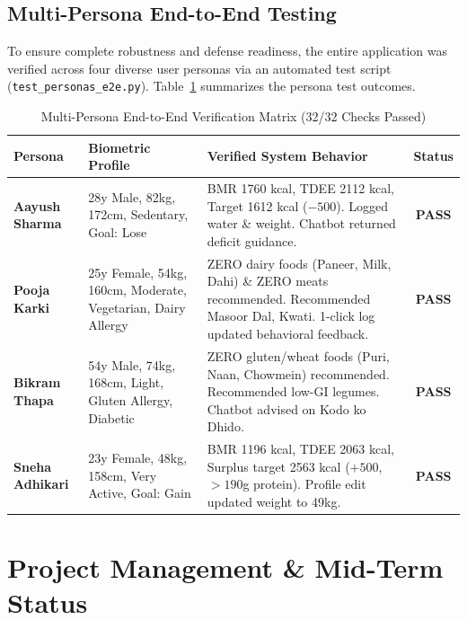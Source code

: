 \documentclass[12pt,a4paper]{report}
\begin{document}
\section{Multi-Persona End-to-End Testing}

To ensure complete robustness and defense readiness, the entire application was verified across four diverse user personas via an automated test script (\texttt{test\_personas\_e2e.py}). Table~\ref{tab:personas} summarizes the persona test outcomes.

\begin{table}[htbp]
\centering
\caption{Multi-Persona End-to-End Verification Matrix (32/32 Checks Passed)}
\label{tab:personas}
\begin{tabular}{p{2.8cm}p{4.2cm}p{5.5cm}c}
\toprule
\textbf{Persona} & \textbf{Biometric Profile} & \textbf{Verified System Behavior} & \textbf{Status} \\
\midrule
\textbf{Aayush Sharma} & 28y Male, 82kg, 172cm, Sedentary, Goal: Lose & BMR 1760 kcal, TDEE 2112 kcal, Target 1612 kcal ($-500$). Logged water \& weight. Chatbot returned deficit guidance. & \textbf{PASS} \\
\midrule
\textbf{Pooja Karki} & 25y Female, 54kg, 160cm, Moderate, Vegetarian, Dairy Allergy & ZERO dairy foods (Paneer, Milk, Dahi) \& ZERO meats recommended. Recommended Masoor Dal, Kwati. 1-click log updated behavioral feedback. & \textbf{PASS} \\
\midrule
\textbf{Bikram Thapa} & 54y Male, 74kg, 168cm, Light, Gluten Allergy, Diabetic & ZERO gluten/wheat foods (Puri, Naan, Chowmein) recommended. Recommended low-GI legumes. Chatbot advised on Kodo ko Dhido. & \textbf{PASS} \\
\midrule
\textbf{Sneha Adhikari} & 23y Female, 48kg, 158cm, Very Active, Goal: Gain & BMR 1196 kcal, TDEE 2063 kcal, Surplus target 2563 kcal ($+500$, $>190$g protein). Profile edit updated weight to 49kg. & \textbf{PASS} \\
\bottomrule
\end{tabular}
\end{table}

\chapter{Project Management \& Mid-Term Status}
\end{document}

